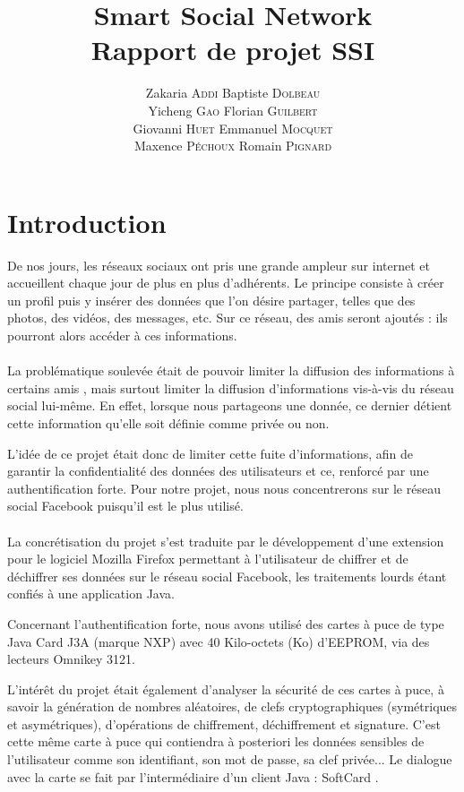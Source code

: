 \documentclass[a4paper,11pt,french]{article}
\title{Smart Social Network\\Rapport de projet SSI }
\author{
    Zakaria \textsc{Addi}
    Baptiste \textsc{Dolbeau}\\
    Yicheng \textsc{Gao}
    Florian \textsc{Guilbert}\\
    Giovanni \textsc{Huet}
    Emmanuel \textsc{Mocquet}\\
    Maxence \textsc{Péchoux}
    Romain \textsc{Pignard}
}
\begin{document}
\maketitle
\clearpage
\tableofcontents
\clearpage

\section{Introduction}
\renewcommand\labelitemi{\textbullet} %
\renewcommand\labelitemii{$\circ$} %
De nos jours, les réseaux sociaux ont pris une grande ampleur sur internet
et accueillent chaque jour de plus en plus d'adhérents. Le principe consiste
à créer un profil puis y insérer des données que l'on désire partager, telles
que des photos, des vidéos, des messages, etc. Sur ce réseau, des \og{}amis \fg{}
seront ajoutés : ils pourront alors accéder à ces informations.

\paragraph{}
La problématique soulevée était de pouvoir limiter la diffusion des informations
à certains \og amis \fg{}, mais surtout limiter la diffusion d'informations
vis-à-vis du réseau social lui-même. En effet, lorsque nous partageons une
donnée, ce dernier détient cette information qu'elle soit définie comme privée
ou non.

L'idée de ce projet était donc de limiter cette fuite d'informations, afin de 
garantir la confidentialité des données des utilisateurs et ce, renforcé par une
authentification forte. Pour notre projet, nous nous concentrerons sur le réseau
social Facebook puisqu'il est le plus utilisé.


\paragraph{}
La concrétisation du projet s'est traduite par le développement d'une extension 
pour le logiciel Mozilla Firefox permettant à l’utilisateur de chiffrer et de
déchiffrer ses données sur le réseau social Facebook, les traitements lourds
étant confiés à une application Java.

Concernant l’authentification forte, nous avons utilisé des cartes à puce de 
type Java Card J3A (marque NXP) avec 40 Kilo-octets (Ko) d'EEPROM, via des 
lecteurs Omnikey 3121. 

L'intérêt du projet était également d'analyser la sécurité de ces cartes à puce,
à savoir la génération de nombres aléatoires, de clefs cryptographiques 
(symétriques et asymétriques), d'opérations de chiffrement, déchiffrement et
signature. C'est cette même carte à puce qui contiendra à posteriori les données
sensibles de l’utilisateur comme son identifiant, son mot de passe, sa clef
privée... Le dialogue avec la carte se fait par l’intermédiaire d’un client
Java : \og{}SoftCard \fg{}. 
\end{document}
